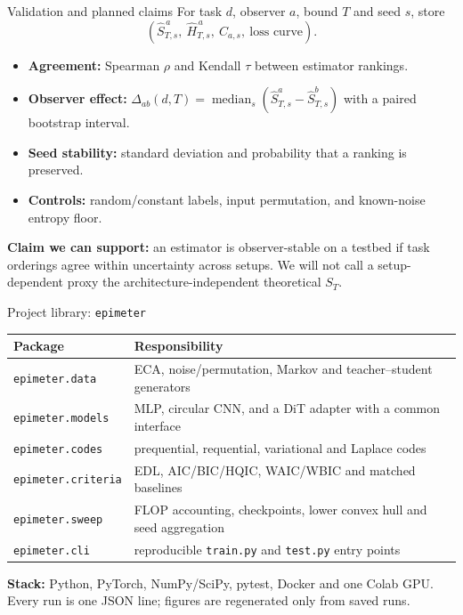 \documentclass[aspectratio=43]{beamer}
\begin{document}
\begin{frame}{Validation and planned claims}
For task $d$, observer $a$, bound $T$ and seed $s$, store
\[
 (\widehat S^{\,a}_{T,s},\ \widehat H^{\,a}_{T,s},\ C_{a,s},\ \text{loss curve}).
\]
\begin{itemize}
\item \textbf{Agreement:} Spearman $\rho$ and Kendall $\tau$ between estimator rankings.
\item \textbf{Observer effect:} $\Delta_{ab}(d,T)=\operatorname{median}_s
      (\widehat S^a_{T,s}-\widehat S^b_{T,s})$ with a paired bootstrap interval.
\item \textbf{Seed stability:} standard deviation and probability that a ranking is preserved.
\item \textbf{Controls:} random/constant labels, input permutation, and known-noise entropy floor.
\end{itemize}

\medskip
\textbf{Claim we can support:} an estimator is observer-stable on a testbed if task orderings agree
within uncertainty across setups. We will not call a setup-dependent proxy the architecture-independent
theoretical $S_T$.
\end{frame}

\begin{frame}{Project library: \texttt{epimeter}}
\begin{center}
\small
\begin{tabular}{ll}
\toprule
Package & Responsibility \\
\midrule
\texttt{epimeter.data} & ECA, noise/permutation, Markov and teacher--student generators \\
\texttt{epimeter.models} & MLP, circular CNN, and a DiT adapter with a common interface \\
\texttt{epimeter.codes} & prequential, requential, variational and Laplace codes \\
\texttt{epimeter.criteria} & EDL, AIC/BIC/HQIC, WAIC/WBIC and matched baselines \\
\texttt{epimeter.sweep} & FLOP accounting, checkpoints, lower convex hull and seed aggregation \\
\texttt{epimeter.cli} & reproducible \texttt{train.py} and \texttt{test.py} entry points \\
\bottomrule
\end{tabular}
\end{center}

\medskip
\textbf{Stack:} Python, PyTorch, NumPy/SciPy, pytest, Docker and one Colab GPU.
Every run is one JSON line; figures are regenerated only from saved runs.
\end{frame}
\end{document}
